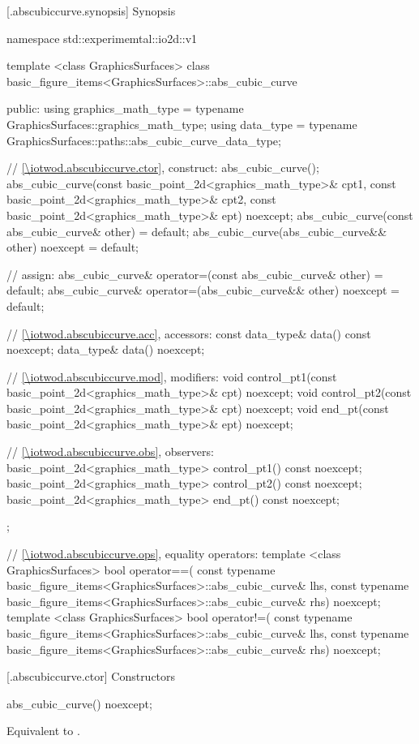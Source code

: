  [\iotwod.abscubiccurve.synopsis] {Synopsis}
\begin{codeblock}
namespace std::experimemtal::io2d::v1 {
  template <class GraphicsSurfaces>
  class basic_figure_items<GraphicsSurfaces>::abs_cubic_curve {
  public:
    using graphics_math_type = typename GraphicsSurfaces::graphics_math_type;
    using data_type =
      typename GraphicsSurfaces::paths::abs_cubic_curve_data_type;

    // \ref{\iotwod.abscubiccurve.ctor}, construct:
    abs_cubic_curve();
    abs_cubic_curve(const basic_point_2d<graphics_math_type>& cpt1,
       const basic_point_2d<graphics_math_type>& cpt2,
       const basic_point_2d<graphics_math_type>& ept) noexcept;
    abs_cubic_curve(const abs_cubic_curve& other) = default;
    abs_cubic_curve(abs_cubic_curve&& other) noexcept = default;

    // assign:
    abs_cubic_curve& operator=(const abs_cubic_curve& other) = default;
    abs_cubic_curve& operator=(abs_cubic_curve&& other) noexcept = default;

    // \ref{\iotwod.abscubiccurve.acc}, accessors:
    const data_type& data() const noexcept;
    data_type& data() noexcept;

    // \ref{\iotwod.abscubiccurve.mod}, modifiers:
    void control_pt1(const basic_point_2d<graphics_math_type>& cpt) noexcept;
    void control_pt2(const basic_point_2d<graphics_math_type>& cpt) noexcept;
    void end_pt(const basic_point_2d<graphics_math_type>& ept) noexcept;

    // \ref{\iotwod.abscubiccurve.obs}, observers:
    basic_point_2d<graphics_math_type> control_pt1() const noexcept;
    basic_point_2d<graphics_math_type> control_pt2() const noexcept;
    basic_point_2d<graphics_math_type> end_pt() const noexcept;
  };

  // \ref{\iotwod.abscubiccurve.ops}, equality operators:
  template <class GraphicsSurfaces>
  bool operator==(
    const typename basic_figure_items<GraphicsSurfaces>::abs_cubic_curve& lhs,
    const typename basic_figure_items<GraphicsSurfaces>::abs_cubic_curve& rhs) 
    noexcept;  
  template <class GraphicsSurfaces>
  bool operator!=(
    const typename basic_figure_items<GraphicsSurfaces>::abs_cubic_curve& lhs,
    const typename basic_figure_items<GraphicsSurfaces>::abs_cubic_curve& rhs) 
    noexcept;  
}
\end{codeblock}

 [\iotwod.abscubiccurve.ctor] {Constructors}%

%
\begin{itemdecl}
abs_cubic_curve() noexcept;
\end{itemdecl}
\begin{itemdescr}
\pnum
\effects
Equivalent to .
\end{itemdescr}

